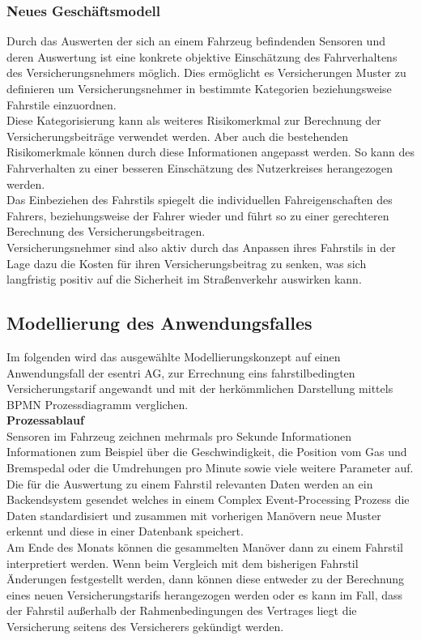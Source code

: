 \documentclass[a4paper, 12pt, twoside, headsepline=true]{scrartcl} %
\begin{document}
\subsubsection{Neues Geschäftsmodell}
Durch das Auswerten der sich an einem Fahrzeug befindenden Sensoren und deren Auswertung ist eine konkrete objektive Einschätzung des Fahrverhaltens des Versicherungsnehmers möglich. Dies ermöglicht es Versicherungen Muster zu definieren um Versicherungsnehmer in bestimmte Kategorien beziehungsweise Fahrstile einzuordnen.\\
Diese Kategorisierung kann als weiteres Risikomerkmal zur Berechnung der Versicherungsbeiträge verwendet werden. Aber auch die bestehenden Risikomerkmale können durch diese Informationen angepasst werden. So kann des Fahrverhalten zu einer besseren Einschätzung des Nutzerkreises herangezogen werden.\\
Das Einbeziehen des Fahrstils spiegelt die individuellen Fahreigenschaften des Fahrers, beziehungsweise der Fahrer wieder und führt so zu einer gerechteren Berechnung des Versicherungsbeitragen. \\
Versicherungsnehmer sind also aktiv durch das Anpassen ihres Fahrstils in der Lage dazu die Kosten für ihren Versicherungsbeitrag zu senken, was sich langfristig positiv auf die Sicherheit im Straßenverkehr auswirken kann\cite{chrisboi}.

\subsection{Modellierung des Anwendungsfalles}\label{usecasemodellierung}
Im folgenden wird das ausgewählte Modellierungskonzept auf einen Anwendungsfall der esentri AG, zur Errechnung eins fahrstilbedingten Versicherungstarif angewandt und mit der herkömmlichen Darstellung mittels BPMN Prozessdiagramm verglichen. \\

\textbf{Prozessablauf}\\
Sensoren im Fahrzeug zeichnen mehrmals pro Sekunde Informationen Informationen zum Beispiel  über die Geschwindigkeit, die Position vom Gas und Bremspedal oder die Umdrehungen pro Minute sowie viele weitere Parameter auf. Die für die Auswertung zu einem Fahrstil relevanten Daten werden an ein Backendsystem gesendet welches in einem Complex Event-Processing Prozess die Daten standardisiert und zusammen mit vorherigen Manövern neue Muster erkennt und diese in einer Datenbank speichert.\\
Am Ende des Monats können die gesammelten Manöver dann zu einem Fahrstil interpretiert werden. Wenn beim Vergleich mit dem bisherigen Fahrstil Änderungen festgestellt werden, dann können diese entweder zu der Berechnung eines neuen Versicherungstarifs herangezogen werden oder es kann im Fall, dass der Fahrstil außerhalb der Rahmenbedingungen des Vertrages liegt die Versicherung seitens des Versicherers gekündigt werden.
\end{document}
